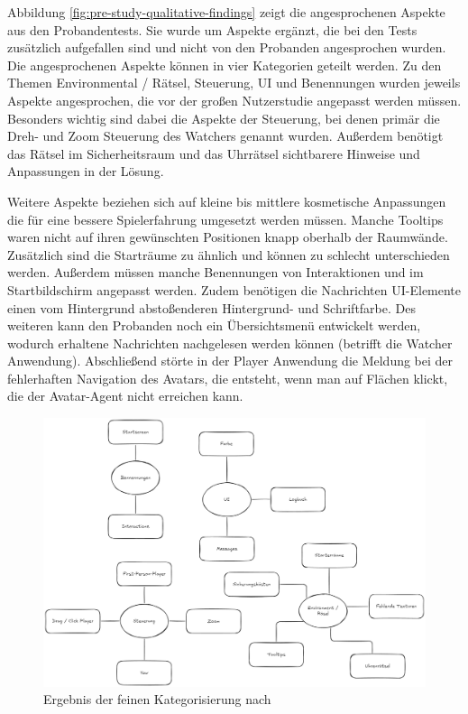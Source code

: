 Abbildung \ref{fig:pre-study-qualitative-findings} zeigt die angesprochenen Aspekte aus den Probandentests. Sie wurde um Aspekte ergänzt, die bei den Tests zusätzlich aufgefallen sind und nicht von den Probanden angesprochen wurden. Die angesprochenen Aspekte können in vier Kategorien geteilt werden. Zu den Themen Environmental / Rätsel, Steuerung, \ac{UI} und Benennungen wurden jeweils Aspekte angesprochen, die vor der großen Nutzerstudie angepasst werden müssen. Besonders wichtig sind dabei die Aspekte der Steuerung, bei denen primär die Dreh- und Zoom Steuerung des Watchers genannt wurden. Außerdem benötigt das Rätsel im Sicherheitsraum und das Uhrrätsel sichtbarere Hinweise und Anpassungen in der Lösung.

Weitere Aspekte beziehen sich auf kleine bis mittlere kosmetische Anpassungen die für eine bessere Spielerfahrung umgesetzt werden müssen. Manche Tooltips waren nicht auf ihren gewünschten Positionen knapp oberhalb der Raumwände. Zusätzlich sind die Starträume zu ähnlich und können zu schlecht unterschieden werden. Außerdem müssen manche Benennungen von Interaktionen und im Startbildschirm angepasst werden. Zudem benötigen die Nachrichten \ac{UI}-Elemente einen vom Hintergrund abstoßenderen Hintergrund- und Schriftfarbe. Des weiteren kann den Probanden noch ein Übersichtsmenü entwickelt werden, wodurch erhaltene Nachrichten nachgelesen werden können (betrifft die Watcher Anwendung). Abschließend störte in der Player Anwendung die Meldung bei der fehlerhaften Navigation des Avatars, die entsteht, wenn man auf Flächen klickt, die der Avatar-Agent nicht erreichen kann.

\begin{figure}[ht]
\centering
\includegraphics[width=1\linewidth]{content/pictures/Prestudy-Qualitative-Auswertung-Schritt-2.png}
\caption{Ergebnis der feinen Kategorisierung nach \cite{braun_using_2006}}
\label{fig:pre-study-qualitative-findings_2}
\end{figure}

